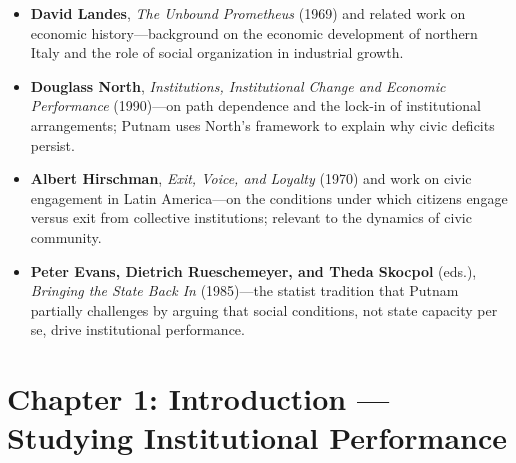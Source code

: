 \documentclass[12pt]{article}
\begin{document}
\begin{itemize}[leftmargin=*, itemsep=4pt]
    \item \textbf{David Landes}, \textit{The Unbound Prometheus} (1969) and related work on economic history---background on the economic development of northern Italy and the role of social organization in industrial growth.
    \item \textbf{Douglass North}, \textit{Institutions, Institutional Change and Economic Performance} (1990)---on path dependence and the lock-in of institutional arrangements; Putnam uses North's framework to explain why civic deficits persist.
    \item \textbf{Albert Hirschman}, \textit{Exit, Voice, and Loyalty} (1970) and work on civic engagement in Latin America---on the conditions under which citizens engage versus exit from collective institutions; relevant to the dynamics of civic community.
    \item \textbf{Peter Evans, Dietrich Rueschemeyer, and Theda Skocpol} (eds.), \textit{Bringing the State Back In} (1985)---the statist tradition that Putnam partially challenges by arguing that social conditions, not state capacity per se, drive institutional performance.
\end{itemize}

\section{Chapter 1: Introduction --- Studying Institutional Performance}
\end{document}
